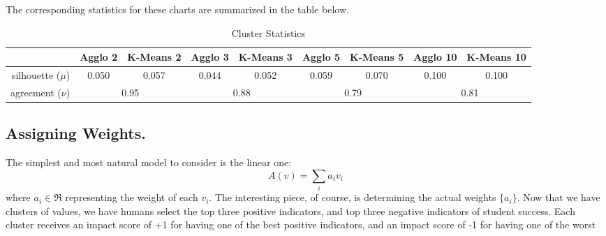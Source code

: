 \documentclass[paper.tex]{subfiles}
\begin{document}
	The corresponding statistics for these charts are summarized in the table below.
	
	\begin{table}[!h]
		\caption{Cluster Statistics}
		\def\arraystretch{1.2}%
		\begin{tabular}{r||cc|cc|cc|cc|}
			 &\small Agglo 2 &\small K-Means 2 &\small Agglo 3 &\small K-Means 3 &\small Agglo 5 &\small  K-Means 5 &\small Agglo 10 &\small K-Means 10\\\hline
		\small silhouette ($\mu$)& 0.050 & 0.057 & 0.044 & 0.052 & 0.059 & 0.070 & 0.100 & 0.100 \\
		\small agreement ($\nu$)  & \multicolumn{2}{|c|}{0.95} & \multicolumn{2}{|c|}{0.88} & \multicolumn{2}{|c|}{0.79}& \multicolumn{2}{|c|}{0.81}\\\hline
		\end{tabular}		\label{t1}
	\end{table}
		
	\subsection{Assigning Weights.}
	The simplest and most natural model to consider is the linear one:
	\[A(v) = \sum_i a_i v_i \]
	where $a_i \in \Re$ representing the weight of each $v_i$. The interesting piece, of course, is determining the actual weights $\{a_i\}$. Now that we have clusters of values, we have humans select the top three positive indicators, and top three negative indicators of student success. Each cluster receives an impact score of +1 for having one of the best positive indicators, and an impact score of -1 for having one of the worst 
	
	
	
\end{document}
